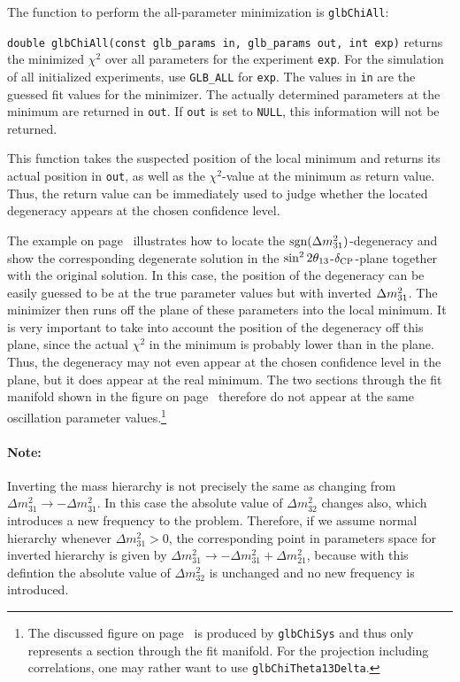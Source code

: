 The function to perform the all-parameter minimization is {\tt glbChiAll}:
\begin{function}
{\tt double glbChiAll(const glb\_params in, glb\_params out, int exp)}
  returns the minimized $\chi^2$ over all parameters for the  experiment {\tt exp}. For the simulation of all initialized experiments,
use {\tt GLB\_ALL} for {\tt exp}. The values in {\tt in} are the guessed fit values for the minimizer. The actually determined parameters at the minimum are returned in {\tt out}. If {\tt out} is set to {\tt NULL}, this information will not be returned.
\end{function}
%
This function takes the suspected position of the local minimum and returns its actual position in {\tt out}, as well as the $\chi^2$-value 
at the minimum as return value. Thus, the return value can be immediately
used to judge whether the located degeneracy appears at the chosen
confidence level.

The example on page~\pageref{ex:sgndeg} illustrates how to locate the $\mathrm{sgn}(\Delta m_{31}^2)$-degeneracy and show the corresponding degenerate solution in the $\sin^2 2 \theta_{13}$-$\delta_{\mathrm{CP}}$-plane together with the original solution.
In this case, the position of the degeneracy can be easily guessed to be 
at the true parameter values but with inverted  $\Delta m_{31}^2$.
The minimizer then runs off the plane of these parameters into the local minimum. It is very important to take into account the position of the degeneracy off this plane, since the actual $\chi^2$ in the minimum is probably lower than in the plane. Thus, the degeneracy may not even appear at the chosen confidence level in the plane, but it does appear at the real minimum. The two sections through the fit manifold shown in the figure on page~\pageref{ex:sgndeg} therefore do not appear at the same oscillation parameter values.\footnote{The discussed figure on page~\pageref{ex:sgndeg} is produced by  {\tt glbChiSys} and thus only represents a section through the fit manifold. For the projection including correlations, one may rather want to use {\tt glbChiTheta13Delta}.} 

\label{mass_ordering}
\paragraph{Note:} Inverting the mass hierarchy is not
precisely the same as changing from $\Delta m^2_{31}
\rightarrow -\Delta m^2_{31}$.
In this case the absolute value of $\Delta m^2_{32}$ changes also, which
introduces a new frequency to the problem. Therefore, if we assume
normal hierarchy  whenever $\Delta m^2_{31}>0$, the corresponding
point in parameters space for inverted hierarchy is given by $\Delta 
m^2_{31}\rightarrow - \Delta m^2_{31} + \Delta m^2_{21}$, because
with this defintion the absolute value of  $\Delta m^2_{32}$ is unchanged
and no new frequency is introduced.\\

